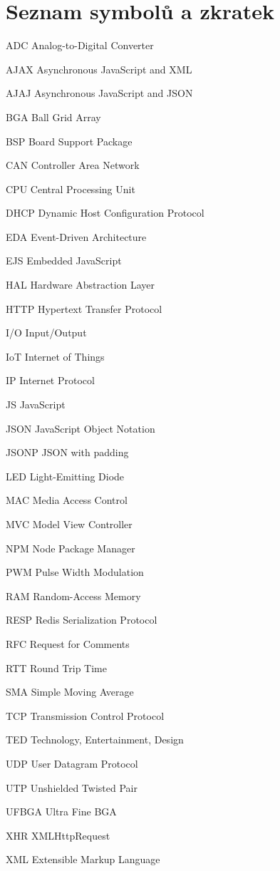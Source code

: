 \documentclass[oneside,12pt,a4paper,final]{book} %
\makeatletter
\newcommand{\tocfill}{\cleaders\hbox{$\m@th \mkern\@dotsep mu . \mkern\@dotsep mu$}\hfill}
\newcommand{\abbrlabel}[1]{\makebox[6cm][l]{\textbf{#1}\ \tocfill}}
\newenvironment{abbreviations}{\begin{list}{}{\renewcommand{\makelabel}{\abbrlabel}%
        \setlength{\labelwidth}{6cm}\setlength{\leftmargin}{\labelwidth+\labelsep}%
                                              \setlength{\itemsep}{0pt}}}{\end{list}}
\makeatother
\begin{document}
\chapter*{Seznam symbolů a zkratek}
\noindent
\begin{abbreviations}
\item[ADC]		Analog-to-Digital Converter
\item[AJAX]		Asynchronous JavaScript and XML
\item[AJAJ]		Asynchronous JavaScript and JSON
\item[BGA]		Ball Grid Array
\item[BSP]		Board Support Package
\item[CAN]		Controller Area Network
\item[CPU]		Central Processing Unit
\item[DHCP]		Dynamic Host Configuration Protocol
\item[EDA]		Event-Driven Architecture
\item[EJS]		Embedded JavaScript
\item[HAL]		Hardware Abstraction Layer
\item[HTTP]		Hypertext Transfer Protocol
\item[I/O]		Input/Output
\item[IoT]		Internet of Things
\item[IP]		Internet Protocol
\item[JS]		JavaScript
\item[JSON]		JavaScript Object Notation
\item[JSONP]	JSON with padding
\item[LED]		Light-Emitting Diode
\item[MAC]		Media Access Control
\item[MVC]		Model View Controller
\item[NPM]		Node Package Manager
\item[PWM]		Pulse Width Modulation
\item[RAM]		Random-Access Memory
\item[RESP]		Redis Serialization Protocol
\item[RFC]		Request for Comments
\item[RTT]		Round Trip Time
\item[SMA]		Simple Moving Average
\item[TCP]		Transmission Control Protocol
\item[TED]		Technology, Entertainment, Design
\item[UDP]		User Datagram Protocol
\item[UTP]		Unshielded Twisted Pair
\item[UFBGA]	Ultra Fine BGA
\item[XHR]		XMLHttpRequest
\item[XML]		Extensible Markup Language
\end{abbreviations}
\end{document}

